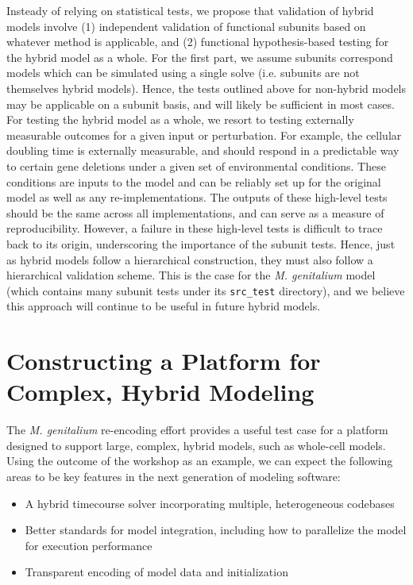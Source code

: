 \documentclass[journal,transmag,twoside]{IEEEtran}
\begin{document}
Insteady of relying on statistical tests, we propose that validation of hybrid models involve (1) independent validation of functional subunits based on whatever method is applicable, and (2) functional hypothesis-based testing for the hybrid model as a whole. For the first part, we assume subunits correspond models which can be simulated using a single solve (i.e. subunits are not themselves hybrid models). Hence, the tests outlined above for non-hybrid models may be applicable on a subunit basis, and will likely be sufficient in most cases. For testing the hybrid model as a whole, we resort to testing externally measurable outcomes for a given input or perturbation. For example, the cellular doubling time is externally measurable, and should respond in a predictable way to certain gene deletions under a given set of environmental conditions. These conditions are inputs to the model and can be reliably set up for the original model as well as any re-implementations. The outputs of these high-level tests should be the same across all implementations, and can serve as a measure of reproducibility. However, a failure in these high-level tests is difficult to trace back to its origin, underscoring the importance of the subunit tests. Hence, just as hybrid models follow a hierarchical construction, they must also follow a hierarchical validation scheme. This is the case for the \textit{M. genitalium} model (which contains many subunit tests under its \texttt{src\_test} directory), and we believe this approach will continue to be useful in future hybrid models.

\section{Constructing a Platform for Complex, Hybrid Modeling}

The \textit{M. genitalium} re-encoding effort provides a useful test case for a platform designed to support large, complex, hybrid models, such as whole-cell models. Using the outcome of the workshop as an example, we can expect the following areas to be key features in the next generation of modeling software:

\begin{itemize}
\item A hybrid timecourse solver incorporating multiple, heterogeneous codebases
\item Better standards for model integration, including how to parallelize the model for execution performance
\item Transparent encoding of model data and initialization
\end{itemize}
\end{document}
